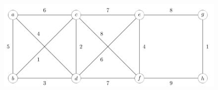 \documentclass[a4paper,12pt]{article}
\begin{document}
\subsection[]{}



\begin{figure}[H]
    \centering
    \includegraphics[width=1\textwidth]{2.png}
    \caption{}
\end{figure}
\section[Question 2]{}
\subsection[]{}



\subsection[]{}



\subsection[]{}



\subsection[]{}
\end{document}
